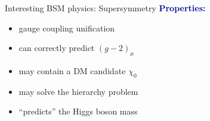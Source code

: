 \documentclass[hyperref={pdfpagelabels=false},ngerman]{beamer}
\renewcommand{\emph}[1]{\textbf{\textcolor{darkblue}{#1}}}
\begin{document}
\begin{frame}{Interesting BSM physics: Supersymmetry}
  \emph{Properties:}
  \begin{itemize}
  \item gauge coupling unification
  \item can correctly predict $(g-2)_\mu$
  \item may contain a DM candidate $\chi_0$
  \item may solve the hierarchy problem
  \item ``predicts'' the Higgs boson mass
  \end{itemize}
\end{frame}

\end{document}
